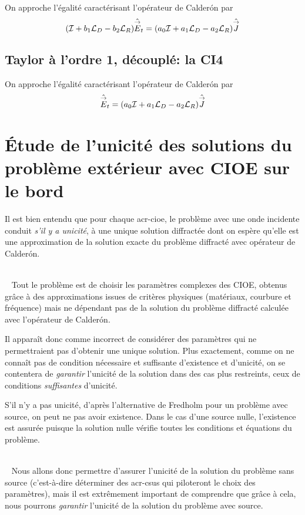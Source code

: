     On approche l'égalité caractérisant l'opérateur de Calderón par
    \[
      ( {\mathcal{I}} + b_1 {\mathcal{L}_D} -b_2 {\mathcal{L}_R} )\hat{{\overset{\rightarrow}{E}}}_t = ( a_0{\mathcal{I}} + a_1 {\mathcal{L}_D} -a_2 {\mathcal{L}_R}) \hat {{\overset{\rightarrow}{J}}}
    \]

  \subsection{Taylor à l'ordre 1, découplé: la CI4}

    On approche l'égalité caractérisant l'opérateur de Calderón par
    \[
      \hat{{\overset{\rightarrow}{E}}}_t = ( a_0{\mathcal{I}} + a_1 {\mathcal{L}_D} - a_2 {\mathcal{L}_R} ) \hat {{\overset{\rightarrow}{J}}}
    \]

\section{Étude de l'unicité des solutions du problème extérieur avec CIOE sur le bord}

  Il est bien entendu que pour chaque \gls{acr-cioe}, le problème avec une onde incidente conduit \emph{s'il y a unicité}, à une unique solution diffractée dont on espère qu'elle est une approximation de la solution exacte du problème diffracté avec opérateur de Calderón.

  {~}\\{~}
  Tout le problème est de choisir les paramètres complexes des CIOE, obtenus grâce à des approximations issues de critères physiques (matériaux, courbure et fréquence) mais ne dépendant pas de la solution du problème diffracté calculée avec l'opérateur de Calderón. 

  Il apparaît donc comme incorrect de considérer des paramètres qui ne permettraient pas d'obtenir une unique solution.
  Plus exactement, comme on ne connaît pas de condition nécessaire et suffisante d'existence et d'unicité, on se contentera de \emph{garantir} l'unicité de la solution dans des cas plus restreints, ceux de conditions \emph{suffisantes} d'unicité.

  S'il n'y a pas unicité, d'après l'alternative de Fredholm pour un problème avec source, on peut ne pas avoir existence.
  Dans le cas d'une source nulle, l'existence est assurée puisque la solution nulle vérifie toutes les conditions et équations du problème.

  {~}\\{~}
  Nous allons donc permettre d'assurer l'unicité de la solution du problème sans source (c'est-à-dire déterminer des \glspl{acr-csu} qui piloteront le choix des paramètres), mais il est extrêmement important de comprendre que grâce à cela, nous pourrons \emph{garantir} l'unicité de la solution du problème avec source.

